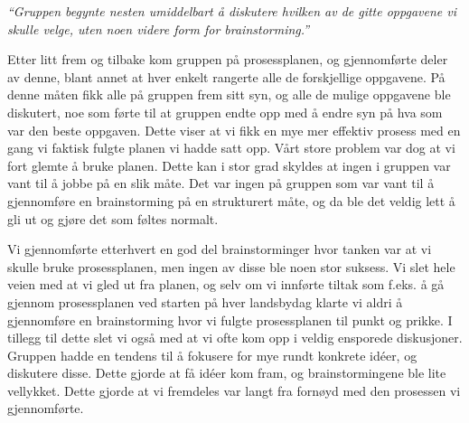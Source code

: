 \emph{“Gruppen begynte nesten umiddelbart å diskutere hvilken av de gitte oppgavene vi skulle velge, uten noen videre form for brainstorming.”} \newline

Etter litt frem og tilbake kom gruppen på prosessplanen, og gjennomførte deler av denne, blant annet at hver enkelt rangerte alle de forskjellige oppgavene. På denne måten fikk alle på gruppen frem sitt syn, og alle de mulige oppgavene ble diskutert, noe som førte til at gruppen endte opp med å endre syn på hva som var den beste oppgaven. Dette viser at vi fikk en mye mer effektiv prosess med en gang vi faktisk fulgte planen vi hadde satt opp. Vårt store problem var dog at vi fort glemte å bruke planen. Dette kan i stor grad skyldes at ingen i gruppen var vant til å jobbe på en slik måte. Det var ingen på gruppen som var vant til å gjennomføre en brainstorming på en strukturert måte, og da ble det veldig lett å gli ut og gjøre det som føltes normalt.

Vi gjennomførte etterhvert en god del brainstorminger hvor tanken var at vi skulle bruke prosessplanen, men ingen av disse ble noen stor suksess. Vi slet hele veien med at vi gled ut fra planen, og selv om vi innførte tiltak som f.eks. å gå gjennom prosessplanen ved starten på hver landsbydag klarte vi aldri å gjennomføre en brainstorming hvor vi fulgte prosessplanen til punkt og prikke. I tillegg til dette slet vi også med at vi ofte kom opp i veldig ensporede diskusjoner. Gruppen hadde en tendens til å fokusere for mye rundt konkrete idéer, og diskutere disse. Dette gjorde at få idéer kom fram, og brainstormingene ble lite vellykket. Dette gjorde at vi fremdeles var langt fra fornøyd med den prosessen vi gjennomførte.

